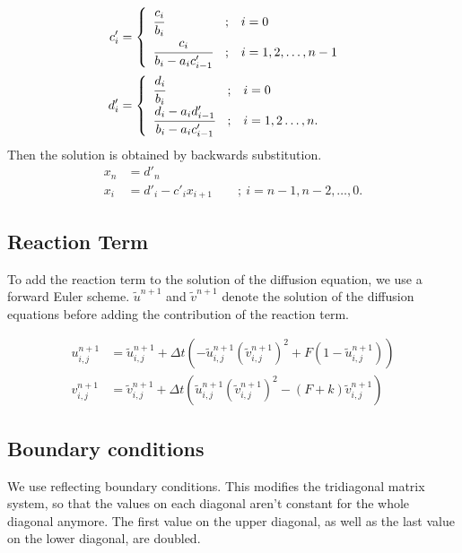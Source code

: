 \documentclass[a4paper]{article}
\begin{document}
\begin{align}
	c'_i &=
\begin{cases}
\begin{array}{lcl}
  \cfrac{c_i}{b_i}                  & ; & i = 0 \\
  \cfrac{c_i}{b_i - a_i c'_{i - 1}} & ; & i = 1, 2, \dots, n-1 \\
\end{array}
\end{cases} \\
d'_i &=
\begin{cases}
\begin{array}{lcl}
  \cfrac{d_i}{b_i}                  & ; & i = 0 \\
  \cfrac{d_i - a_i d'_{i - 1}}{b_i - a_i c'_{i - 1}} & ; & i = 1, 2 \dots, n. \\
\end{array}
\end{cases}
\end{align}
Then the solution is obtained by backwards substitution.
\begin{align}
	x_n &= d'_n \\
	x_i &= d'_i - c'_i x_{i + 1} \qquad ; \ i = n - 1, n - 2, \ldots, 0.
\end{align}


\subsection{Reaction Term}
To add the reaction term to the solution of the diffusion equation, we use a forward Euler scheme.
$\tilde u^{n+1}$ and $\tilde v^{n+1}$ denote the solution of the diffusion equations before adding the contribution of the reaction term.

\begin{align}
	u_{i,j}^{n+1} &= \tilde u_{i,j}^{n+1} + \Delta t \left( - \tilde u_{i,j}^{n+1} (\tilde v_{i,j}^{n+1})^2 + F ( 1- \tilde u_{i,j}^{n+1} ) \right) \\
	v_{i,j}^{n+1} &= \tilde v_{i,j}^{n+1} + \Delta t \left( \tilde u_{i,j}^{n+1} (\tilde v_{i,j}^{n+1})^2 - (F+k) \tilde v_{i,j}^{n+1} \right)
\end{align}


\subsection{Boundary conditions}
We use reflecting boundary conditions.
This modifies the tridiagonal matrix system, so that the values on each diagonal aren't constant for the whole diagonal anymore.
The first value on the upper diagonal, as well as the last value on the lower diagonal, are doubled.
\end{document}
